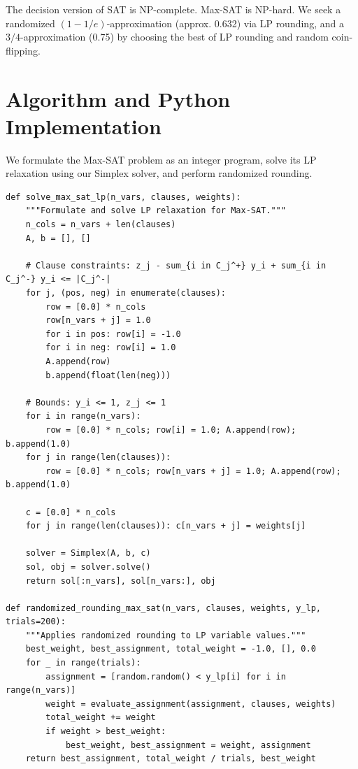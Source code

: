 \documentclass[11pt,oneside]{book}
\begin{document}
The decision version of SAT is NP-complete. Max-SAT is NP-hard. We seek a randomized $(1 - 1/e)$-approximation (approx. 0.632) via LP rounding, and a $3/4$-approximation (0.75) by choosing the best of LP rounding and random coin-flipping.

\section{Algorithm and Python Implementation}
We formulate the Max-SAT problem as an integer program, solve its LP relaxation using our Simplex solver, and perform randomized rounding.

\begin{lstlisting}[style=python, caption=Randomized Rounding for Max-SAT]
def solve_max_sat_lp(n_vars, clauses, weights):
    """Formulate and solve LP relaxation for Max-SAT."""
    n_cols = n_vars + len(clauses)
    A, b = [], []
    
    # Clause constraints: z_j - sum_{i in C_j^+} y_i + sum_{i in C_j^-} y_i <= |C_j^-|
    for j, (pos, neg) in enumerate(clauses):
        row = [0.0] * n_cols
        row[n_vars + j] = 1.0
        for i in pos: row[i] = -1.0
        for i in neg: row[i] = 1.0
        A.append(row)
        b.append(float(len(neg)))
        
    # Bounds: y_i <= 1, z_j <= 1
    for i in range(n_vars):
        row = [0.0] * n_cols; row[i] = 1.0; A.append(row); b.append(1.0)
    for j in range(len(clauses)):
        row = [0.0] * n_cols; row[n_vars + j] = 1.0; A.append(row); b.append(1.0)
        
    c = [0.0] * n_cols
    for j in range(len(clauses)): c[n_vars + j] = weights[j]
    
    solver = Simplex(A, b, c)
    sol, obj = solver.solve()
    return sol[:n_vars], sol[n_vars:], obj

def randomized_rounding_max_sat(n_vars, clauses, weights, y_lp, trials=200):
    """Applies randomized rounding to LP variable values."""
    best_weight, best_assignment, total_weight = -1.0, [], 0.0
    for _ in range(trials):
        assignment = [random.random() < y_lp[i] for i in range(n_vars)]
        weight = evaluate_assignment(assignment, clauses, weights)
        total_weight += weight
        if weight > best_weight:
            best_weight, best_assignment = weight, assignment
    return best_assignment, total_weight / trials, best_weight
\end{lstlisting}
\end{document}
